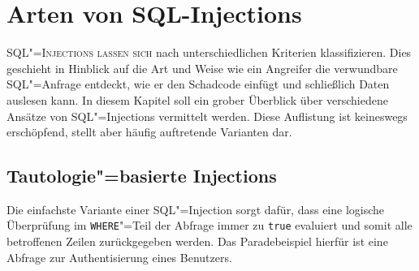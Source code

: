 












\chapter{Arten von SQL-Injections}
\lettrine[lines=2]{S}{QL"=Injections lassen sich}  nach unterschiedlichen Kriterien klassifizieren. Dies geschieht in Hinblick auf die Art und Weise wie ein Angreifer die verwundbare SQL"=Anfrage entdeckt, wie er den Schadcode einfügt und schließlich Daten auslesen kann. In diesem Kapitel soll ein grober Überblick über verschiedene Ansätze von SQL"=Injections vermittelt werden. Diese Auflistung ist keineswegs erschöpfend, stellt aber häufig auftretende Varianten dar.

\section{Tautologie"=basierte Injections}

Die einfachste Variante einer SQL"=Injection sorgt dafür, dass eine logische Überprüfung im \texttt{WHERE}"=Teil der Abfrage immer zu \texttt{true} evaluiert und somit alle betroffenen Zeilen zurückgegeben werden. Das Paradebeispiel hierfür ist eine Abfrage zur Authentisierung eines Benutzers.


